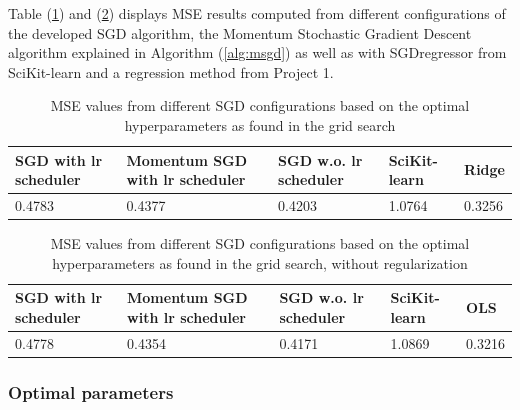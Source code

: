 \documentclass
[twocolumn,
secnumarabic,
nobibnotes,
aps,
prl,
reprint,
groupedaddress,
amsmath,
amssymb
]{revtex4-2}
\begin{document}
Table (\ref{tab:a_mse}) and (\ref{tab:a_mse_lrlmb}) displays MSE results computed from different configurations of the developed SGD algorithm, the Momentum Stochastic Gradient Descent algorithm explained in Algorithm (\ref{alg:msgd}) as well as with SGDregressor from SciKit-learn and a regression method from Project 1.

\begin{table}
  \caption{\label{tab:a_mse}MSE values from different SGD configurations based on the optimal hyperparameters as found in the grid search}
  \begin{ruledtabular}
    \begin{tabular}{lllll}
      SGD with lr scheduler & Momentum SGD with lr scheduler & SGD w.o. lr scheduler & SciKit-learn & Ridge  \\
      \hline
      0.4783                & 0.4377                         & 0.4203                & 1.0764       & 0.3256 \\
    \end{tabular}
  \end{ruledtabular}
\end{table}

\begin{table}
  \caption{\label{tab:a_mse_lrlmb}MSE values from different SGD configurations based on the optimal hyperparameters as found in the grid search, without regularization}
  \begin{ruledtabular}
    \begin{tabular}{lllll}
      SGD with lr scheduler & Momentum SGD with lr scheduler & SGD w.o. lr scheduler & SciKit-learn & OLS    \\
      \hline
      0.4778                & 0.4354                         & 0.4171                & 1.0869       & 0.3216 \\
    \end{tabular}
  \end{ruledtabular}
\end{table}





\subsubsection{Optimal parameters}
\end{document}
